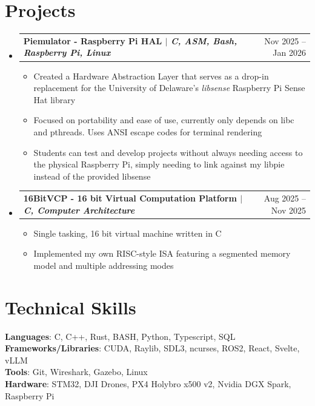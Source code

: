 \documentclass[11pt,a4paper]{article}
\makeatletter
\newcommand{\resumeProjectHeading}[2]{
    \item
    \begin{tabular*}{0.97\textwidth}{l@{\extracolsep{\fill}}r}
      \small\textbf{#1} & #2 \\
    \end{tabular*}\vspace{-7pt}
}
\newcommand{\resumeItemListStart}{\begin{itemize}[leftmargin=0.15in, labelsep=5pt, itemsep=0pt, topsep=0pt]}
\newcommand{\resumeItemListEnd}{\end{itemize}\vspace{-2pt}}
\newcommand{\resumeItem}[1]{\item\small{#1}}
\makeatother
\begin{document}
\section{Projects}
\begin{itemize}[leftmargin=0.15in, label={}]

    \resumeProjectHeading
      {\textbf{Piemulator - Raspberry Pi HAL} $|$ \emph{C, ASM, Bash, Raspberry Pi, Linux}}{Nov 2025  -- Jan 2026}
      \resumeItemListStart
        \resumeItem{Created a Hardware Abstraction Layer that serves as a drop-in replacement for the University of Delaware's \textit{libsense} Raspberry Pi Sense Hat library}
\resumeItem{Focused on portability and ease of use, currently only depends on libc and pthreads. Uses ANSI escape codes for terminal rendering}
        \resumeItem{Students can test and develop projects without always needing access to the physical Raspberry Pi, simply needing to link against my libpie instead of the provided libsense}
      \resumeItemListEnd

    \resumeProjectHeading
      {\textbf{16BitVCP - 16 bit Virtual Computation Platform} $|$ \emph{C, Computer Architecture}}{Aug 2025 -- Nov 2025}
      \resumeItemListStart
        \resumeItem{Single tasking, 16 bit virtual machine written in C}

        \resumeItem{Implemented my own RISC-style ISA featuring a segmented memory model and multiple addressing modes}
        
      \resumeItemListEnd

\end{itemize}

\section{Technical Skills}
 \begin{itemize}[leftmargin=0.15in, label={}]
    \small{\item{
     \textbf{Languages}{: C, C++, Rust, BASH, Python, Typescript, SQL} \\
     \textbf{Frameworks/Libraries}{: CUDA, Raylib, SDL3, ncurses, ROS2, React, Svelte, vLLM}\\
     \textbf{Tools}{: Git, Wireshark, Gazebo, Linux}\\
     \textbf{Hardware}{: STM32, DJI Drones, PX4 Holybro x500 v2, Nvidia DGX Spark, Raspberry Pi}
    }}
 \end{itemize}
\end{document}

